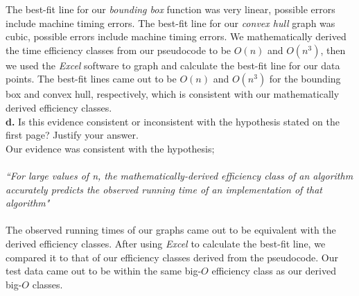 \documentclass[09pt]{article}
\begin{document}
\hangindent=0.2in
The best-fit line for our \emph{bounding box} function was very linear, possible errors include machine timing errors. The best-fit line for our \emph{convex hull} graph was cubic, possible errors include machine timing errors. We mathematically derived the time efficiency classes from our pseudocode to be $O(n)$ and $O(n^3)$, then we used the \emph{Excel} software to graph and calculate the best-fit line for our data points.  The best-fit lines came out to be $O(n)$ and $O(n^3)$ for the bounding box and convex hull, respectively, which is consistent with our mathematically derived efficiency classes. \\

\noindent
\textbf{d.} Is this evidence consistent or inconsistent with the hypothesis stated on the first page? Justify your answer. \\

\hangindent=0.2in
Our evidence was consistent with the hypothesis; \\ \\
\emph{``For large values of n, the mathematically-derived efficiency class of an algorithm accurately predicts the observed running time of an implementation of that algorithm"} \\ \\
The observed running times of our graphs came out to be equivalent with the derived efficiency classes.  After using \emph{Excel} to calculate the best-fit line, we compared it to that of our efficiency classes derived from the pseudocode.  Our test data came out to be within the same big-$O$ efficiency class as our derived big-$O$ classes. \\
\end{document}
